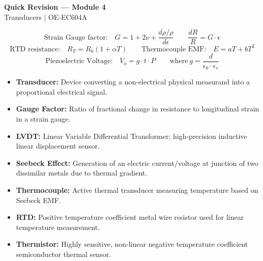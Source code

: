 \documentclass[12pt,a4paper]{article}
\begin{document}
\newpage
\begin{center}
  {\large\bfseries\color{myred} Quick Revision --- Module 4}\\[3pt]
  {\small\color{mydark} Transducers $|$ OE-EC604A}
\end{center}
\noindent{\color{myred}\rule{\linewidth}{1.2pt}}
\vspace{4pt}

\begin{tcolorbox}[formulabox, title={\textbf{Key Transducer Formulas}}]
$$\text{Strain Gauge factor:} \quad G = 1 + 2\nu + \frac{d\rho/\rho}{d\epsilon} \qquad \frac{dR}{R} = G \cdot \epsilon$$
$$\text{RTD resistance:} \quad R_T = R_0(1 + \alpha T) \qquad \text{Thermocouple EMF:} \quad E = aT + bT^2$$
$$\text{Piezoelectric Voltage:} \quad V_o = g \cdot t \cdot P \qquad \text{where} \ g = \frac{d}{\epsilon_0 \cdot \epsilon_r}$$
\end{tcolorbox}

\begin{tcolorbox}[defbox, title={\textbf{One-Line Definitions}}]
\begin{itemize}[leftmargin=*, itemsep=2.5pt, topsep=0pt]
  \item \textbf{Transducer:} Device converting a non-electrical physical measurand into a proportional electrical signal.
  \item \textbf{Gauge Factor:} Ratio of fractional change in resistance to longitudinal strain in a strain gauge.
  \item \textbf{LVDT:} Linear Variable Differential Transformer; high-precision inductive linear displacement sensor.
  \item \textbf{Seebeck Effect:} Generation of an electric current/voltage at junction of two dissimilar metals due to thermal gradient.
  \item \textbf{Thermocouple:} Active thermal transducer measuring temperature based on Seebeck EMF.
  \item \textbf{RTD:} Positive temperature coefficient metal wire resistor used for linear temperature measurement.
  \item \textbf{Thermistor:} Highly sensitive, non-linear negative temperature coefficient semiconductor thermal sensor.
\end{itemize}
\end{tcolorbox}
\end{document}
